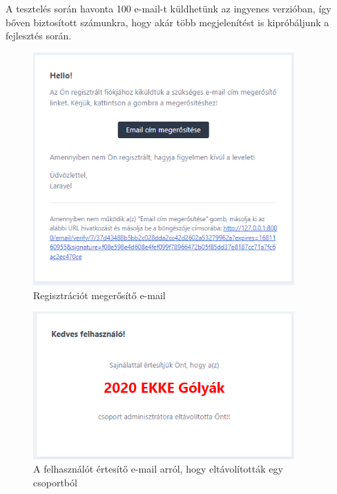 \documentclass[
]{thesis-ekf}
\theoremstyle{definition}
\theoremstyle{remark}
\begin{document}
                A tesztelés során havonta 100 e-mail-t küldhetünk az ingyenes verzióban, így bőven biztosított számunkra, hogy akár több megjelenítést is kipróbáljunk a fejlesztés során.
                \begin{figure}[ht!]
    		    \centering
    		    \includegraphics[width=10cm]{Mailtrap_register.png}
                    \caption{Regisztrációt megerősítő e-mail}
    		    \label{fig-mailtrap-register}
    	    \end{figure}
                \begin{figure}[ht!]
        		\centering
    		    \includegraphics[width=10cm]{Mailtrap_kick.png}
                    \caption{A felhasználót értesítő e-mail arról, hogy eltávolították egy csoportból}
    		      \label{fig-mailtrap-kick}
    	     \end{figure}
\end{document}
